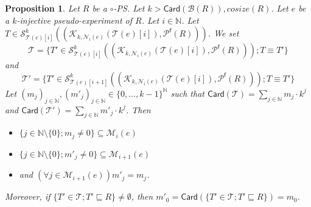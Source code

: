 \documentclass{article}
\theoremstyle{plain}
\newtheorem{prop}[theorem]{Proposition}
\newcommand{\Nat}{\ensuremath{\mathbb{N}}}
\newcommand{\nontrivialconnected}[3]{\mathcal{S}_{#1}^{#3}(#2)}
\newcommand{\taylor}[2]{\mathcal{T}(#1)[#2]}
\newcommand{\criticalports}[3]{\mathcal{K}_{#2, #3}(#1)}
\newcommand{\cosize}[1]{\textit{cosize}(#1)}
\newcommand{\conclusions}[1]{\mathcal{P}^{\textsf{f}}(#1)}
\newcommand{\Card}[1]{\textsf{Card}\left( #1 \right)}
\newcommand{\boxes}[1]{\mathcal{B}(#1)}
\begin{document}
\begin{prop}\label{prop: crucial}
Let $R$ be a $\circ$-PS. Let $k > \Card{\boxes{R}{}}, \cosize{R}$. 
Let $e$ be a $k$-injective pseudo-experiment of $R$. Let $i \in \Nat$. 
Let $T \in \nontrivialconnected{\taylor{e}{i}}{(\criticalports{\taylor{e}{i}}{k}{\mathcal{N}_i(e)}, \conclusions{R})}{k}$. We set 
$$\mathcal{T} = \{ T' \in \nontrivialconnected{\taylor{e}{i}}{(\criticalports{\taylor{e}{i}}{k}{\mathcal{N}_i(e)},  \conclusions{R })}{k} ; T \equiv T' \}$$
and
$$\mathcal{T'} = \{ T' \in \nontrivialconnected{\taylor{e}{i+1}}{(\criticalports{\taylor{e}{i}}{k}{\mathcal{N}_i(e)},  \conclusions{R })}{k} ; T \equiv T' \}$$
Let $(m_j)_{j \in \Nat}, (m'_j)_{j \in \Nat} \in \{ 0, \ldots, k-1 \}^\Nat$ such that $\Card{\mathcal{T}}  = \sum_{j \in \Nat} m_j \cdot k^j$ 
and $ \Card{\mathcal{T'}} = \sum_{j \in \Nat} m'_j \cdot k^j$. Then 
\begin{itemize}
\item $\{ j \in \Nat \setminus \{ 0 \} ; m_j \not= 0 \} \subseteq \mathcal{M}_i(e)$
\item $\{ j \in \Nat \setminus \{ 0 \} ; m'_j \not= 0 \} \subseteq \mathcal{M}_{i+1}(e)$
\item and $(\forall j \in \mathcal{M}_{i+1}(e)) m'_j = m_j$.
\end{itemize}
Moreover, if $\{ T' \in \mathcal{T} ; T' \sqsubseteq R \} \not= \emptyset$, then $m'_0 = \Card{ \{ T' \in \mathcal{T} ; T' \sqsubseteq R \} } = m_0$.
\end{prop}
\end{document}

